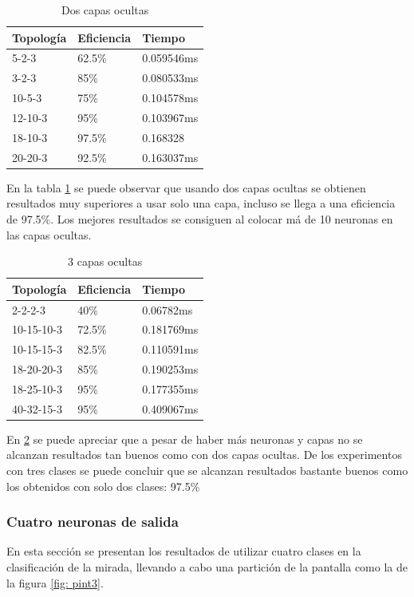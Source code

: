 \begin{table}[]
	\centering
	\caption{Dos capas ocultas}
	\label{my-label}
	\begin{tabular}{|l|l|l|}
		\hline
		Topología & Eficiencia & Tiempo     \\ \hline
		5-2-3     & 62.5\%     & 0.059546ms \\ \hline
		3-2-3     & 85\%       & 0.080533ms \\ \hline
		10-5-3    & 75\%       & 0.104578ms \\ \hline
		12-10-3   & 95\%       & 0.103967ms \\ \hline
		18-10-3   & 97.5\%     & 0.168328   \\ \hline
		20-20-3   & 92.5\%     & 0.163037ms \\ \hline
	\end{tabular}\label{tab:dosCapas3}
\end{table}
En la tabla \ref{tab:dosCapas3} se puede observar que usando dos capas ocultas se obtienen resultados muy superiores a usar solo una capa, incluso se llega a una eficiencia de 97.5\%. Los mejores resultados se consiguen al colocar má de 10 neuronas en las capas ocultas.
\begin{table}[]
	\centering
	\caption{3 capas ocultas}
	\label{my-label}
	\begin{tabular}{|l|l|l|}
		\hline
		Topología  & Eficiencia & Tiempo     \\ \hline
		2-2-2-3    & 40\%       & 0.06782ms  \\ \hline
		10-15-10-3 & 72.5\%     & 0.181769ms \\ \hline
		10-15-15-3 & 82.5\%     & 0.110591ms \\ \hline
		18-20-20-3 & 85\%       & 0.190253ms \\ \hline
		18-25-10-3 & 95\%       & 0.177355ms \\ \hline
		40-32-15-3 & 95\%       & 0.409067ms \\ \hline
	\end{tabular}\label{tab:tresCapas3}
\end{table}
En \ref{tab:tresCapas3} se puede apreciar que a pesar de haber más neuronas y capas no se alcanzan resultados tan buenos como con dos capas ocultas. De los experimentos con tres clases se puede concluir que se alcanzan resultados bastante buenos como los obtenidos con solo dos clases: 97.5\%

\subsubsection{Cuatro neuronas de salida}
En esta sección se presentan los resultados de utilizar cuatro clases en la clasificación de la mirada, llevando a cabo una partición de la pantalla como la de la figura \ref{fig: pint3}.

